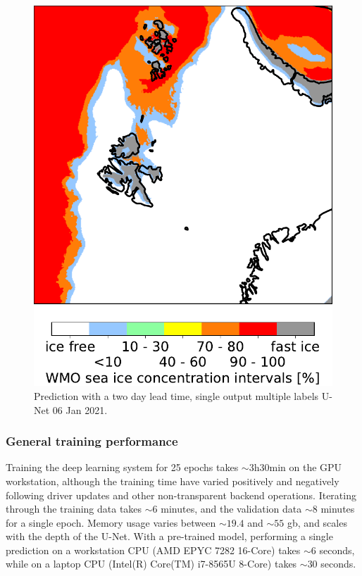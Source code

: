 \documentclass[../main/thesis]{subfiles}
\begin{document}
\begin{figure}
    \centering
    \includegraphics[width=.9\textwidth]{20210106}
    \caption{\label{fig:singleoutmodel}Prediction with a two day lead time, single output multiple labels U-Net 06 Jan 2021.}
\end{figure}

\subsubsection{General training performance}
Training the deep learning system for 25 epochs takes $\sim 3\text{h}30\text{min}$ on the GPU workstation, although the training time have varied positively and negatively following driver updates and other non-transparent backend operations. Iterating through the training data takes $\sim 6$ minutes, and the validation data $\sim 8$ minutes for a single epoch. Memory usage varies between $\sim19.4$ and $\sim55$ gb, and scales with the depth of the U-Net. With a pre-trained model, performing a single prediction on a workstation CPU (AMD EPYC 7282 16-Core) takes $\sim 6$ seconds, while on a laptop CPU (Intel(R) Core(TM) i7-8565U 8-Core) takes $\sim 30$ seconds.
\end{document}
